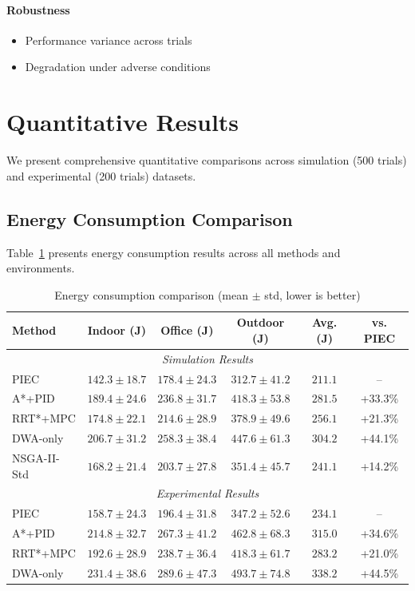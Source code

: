 \paragraph{Robustness}
\begin{itemize}
    \item Performance variance across trials
    \item Degradation under adverse conditions
\end{itemize}

\section{Quantitative Results}
\label{sec:quantitative_results}

We present comprehensive quantitative comparisons across simulation (500 trials) and experimental (200 trials) datasets.

\subsection{Energy Consumption Comparison}

Table~\ref{tab:comparison_energy} presents energy consumption results across all methods and environments.

\begin{table}[htbp]
\centering
\caption{Energy consumption comparison (mean $\pm$ std, lower is better)}
\label{tab:comparison_energy}
\begin{tabular}{lccccc}
\toprule
\textbf{Method} & \textbf{Indoor (J)} & \textbf{Office (J)} & \textbf{Outdoor (J)} & \textbf{Avg. (J)} & \textbf{vs. PIEC} \\
\midrule
\multicolumn{6}{c}{\textit{Simulation Results}} \\
\midrule
PIEC & $\mathbf{142.3 \pm 18.7}$ & $\mathbf{178.4 \pm 24.3}$ & $\mathbf{312.7 \pm 41.2}$ & $\mathbf{211.1}$ & -- \\
A*+PID & $189.4 \pm 24.6$ & $236.8 \pm 31.7$ & $418.3 \pm 53.8$ & $281.5$ & +33.3\% \\
RRT*+MPC & $174.8 \pm 22.1$ & $214.6 \pm 28.9$ & $378.9 \pm 49.6$ & $256.1$ & +21.3\% \\
DWA-only & $206.7 \pm 31.2$ & $258.3 \pm 38.4$ & $447.6 \pm 61.3$ & $304.2$ & +44.1\% \\
NSGA-II-Std & $168.2 \pm 21.4$ & $203.7 \pm 27.8$ & $351.4 \pm 45.7$ & $241.1$ & +14.2\% \\
\midrule
\multicolumn{6}{c}{\textit{Experimental Results}} \\
\midrule
PIEC & $\mathbf{158.7 \pm 24.3}$ & $\mathbf{196.4 \pm 31.8}$ & $\mathbf{347.2 \pm 52.6}$ & $\mathbf{234.1}$ & -- \\
A*+PID & $214.8 \pm 32.7$ & $267.3 \pm 41.2$ & $462.8 \pm 68.3$ & $315.0$ & +34.6\% \\
RRT*+MPC & $192.6 \pm 28.9$ & $238.7 \pm 36.4$ & $418.3 \pm 61.7$ & $283.2$ & +21.0\% \\
DWA-only & $231.4 \pm 38.6$ & $289.6 \pm 47.3$ & $493.7 \pm 74.8$ & $338.2$ & +44.5\% \\
\bottomrule
\end{tabular}
\end{table}

